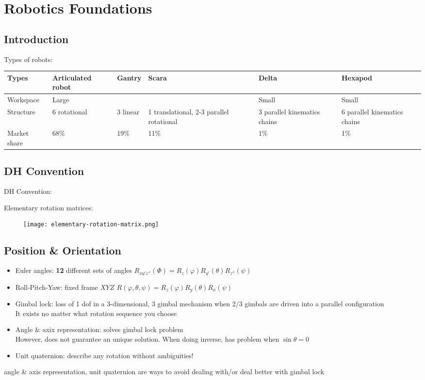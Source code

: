 \chapter{Robotics Foundations}

\section{Introduction}
Types of robots:
\begin{center}
	\begin{tabular}{m{2cm}|m{2.2cm}|m{1.5cm}|m{2.7cm}|m{2.2cm}|m{2cm}}
		Types & Articulated robot & Gantry & Scara & Delta & Hexapod\\ \hline\hline
		Workspace & Large & & & Small & Small \\\hline
		Structure & 6 rotational & 3 linear & 1 translational, 2-3 parallel rotational & 3 parallel kinematics chains & 6 parallel kinematics chains\\ \hline
		Market share & 68\% & 19\% & 11\% & 1\%	& 1\%
	\end{tabular}
\end{center}

\section{DH Convention}
\ac{DH} Convention: \todo{}

Elementary rotation matrices:
\begin{figure}[hbt!]
	\centering
	\texttt{[image: elementary-rotation-matrix.png]}
\end{figure}

\section{Position \& Orientation}
\begin{itemize}
	\item Euler angles: \textbf{12} different sets of angles $R_{xy'z''}(\Phi) = R_z(\varphi) R_{y'}(\theta) R_{z''}(\psi)$
	\item Roll-Pitch-Yaw: fixed frame $XYZ$ $R(\varphi, \theta, \psi) = R_z(\varphi) R_y(\theta) R_x(\psi)$
	\item Gimbal lock: loss of 1 \ac{dof} in a 3-dimensional, 3 gimbal mechanism when 2/3 gimbals are driven into a parallel configuration\\
	\note It exists no matter what rotation sequence you choose
	\item Angle \& axix representation: solves gimbal lock problem\\
	However, does not guarantee an unique solution. When doing inverse, has problem when $\sin \theta=0$
	\item Unit quaternion:  describe any rotation without ambiguities!
\end{itemize}
 angle \& axis representation, unit quaternion are ways to avoid dealing with/or deal better with gimbal lock


